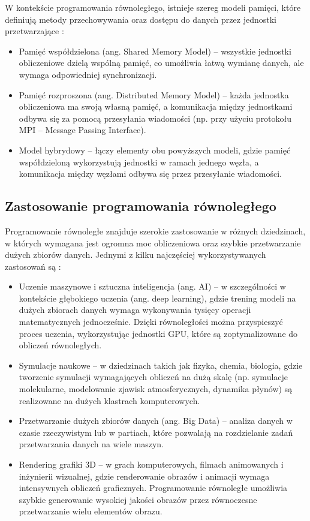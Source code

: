 W kontekście programowania równoległego, istnieje szereg modeli pamięci, które definiują metody przechowywania oraz dostępu do danych przez jednostki przetwarzające \cite{CUDA}:
\begin{itemize}
    \item Pamięć współdzielona (ang. Shared Memory Model) – wszystkie jednostki obliczeniowe dzielą wspólną pamięć, co umożliwia łatwą wymianę danych, ale wymaga odpowiedniej synchronizacji.
    \item Pamięć rozproszona (ang. Distributed Memory Model) – każda jednostka obliczeniowa ma swoją własną pamięć, a komunikacja między jednostkami odbywa się za pomocą przesyłania wiadomości (np. przy użyciu protokołu MPI – Message Passing Interface).
    \item Model hybrydowy – łączy elementy obu powyższych modeli, gdzie pamięć współdzieloną wykorzystują jednostki w ramach jednego węzła, a komunikacja między węzłami odbywa się przez przesyłanie wiadomości.
\end{itemize}

\subsection{Zastosowanie programowania równoległego}
Programowanie równoległe znajduje szerokie zastosowanie w różnych dziedzinach, w których wymagana jest ogromna moc obliczeniowa oraz szybkie przetwarzanie dużych zbiorów danych. Jednymi z kilku najczęściej wykorzystywanych zastosowań są \cite{ParallelProgramming}:
\begin{itemize}
    \item Uczenie maszynowe i sztuczna inteligencja (ang. AI) – w szczególności w kontekście głębokiego uczenia (ang. deep learning), gdzie trening modeli na dużych zbiorach danych wymaga wykonywania tysięcy operacji matematycznych jednocześnie. Dzięki równoległości można przyspieszyć proces uczenia, wykorzystując jednostki GPU, które są zoptymalizowane do obliczeń równoległych.
    \item Symulacje naukowe – w dziedzinach takich jak fizyka, chemia, biologia, gdzie tworzenie symulacji wymagających obliczeń na dużą skalę (np. symulacje molekularne, modelowanie zjawisk atmosferycznych, dynamika płynów) są realizowane na dużych klastrach komputerowych.
    \item Przetwarzanie dużych zbiorów danych (ang. Big Data) – analiza danych w czasie rzeczywistym lub w partiach, które pozwalają na rozdzielanie zadań przetwarzania danych na wiele maszyn.
    \item Rendering grafiki 3D – w grach komputerowych, filmach animowanych i inżynierii wizualnej, gdzie renderowanie obrazów i animacji wymaga intensywnych obliczeń graficznych. Programowanie równoległe umożliwia szybkie generowanie wysokiej jakości obrazów przez równoczesne przetwarzanie wielu elementów obrazu.
\end{itemize}

